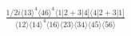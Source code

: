 \documentclass[varwidth, border=5pt]{standalone}
\begin{document}
\begin{my}
$\begin{gathered}
\scriptscriptstyle\frac{1/2i\langle13\rangle^4\langle46\rangle^4\langle1|2+3|4]\langle4|2+3|1]}{\langle12\rangle\langle14\rangle^4\langle16\rangle\langle23\rangle\langle34\rangle\langle45\rangle\langle56\rangle}
\end{gathered}$
\end{my}
\end{document}
